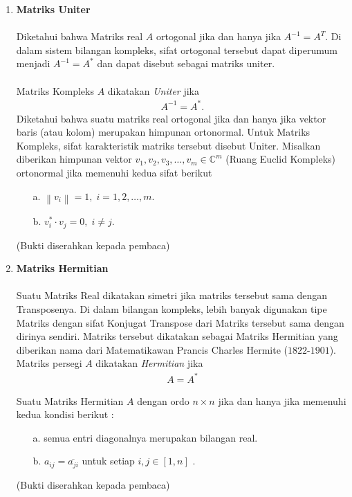 \documentclass[11pt,a4paper]{article}
\theoremstyle{plain}
\theoremstyle{definition}
\theoremstyle{remark}
\begin{document}
\begin{enumerate}
	\item \textbf{Matriks Uniter}\\
	\\
	\hspace*{0.5cm} Diketahui bahwa Matriks real $A$ ortogonal jika dan hanya jika $A^{-1}=A^{T}$. Di dalam sistem bilangan kompleks, sifat ortogonal tersebut dapat diperumum menjadi $A^{-1}=A^*$ dan dapat disebut sebagai matriks uniter.\\
	\\
	Matriks Kompleks $A$ dikatakan \textit{Uniter} jika
	\begin{align*}
		A^{-1}=A^*.	 	
	\end{align*}
	\hspace*{0.5cm} Diketahui bahwa suatu matriks real ortogonal jika dan hanya jika vektor baris (atau kolom) merupakan himpunan ortonormal. Untuk Matriks Kompleks, sifat karakteristik matriks tersebut disebut Uniter. Misalkan diberikan himpunan vektor ${v_{1},v_{2},v_{3},\ldots,v_{m}}\in \mathbb{C}^{m}$ (Ruang Euclid Kompleks) ortonormal jika memenuhi kedua sifat berikut
	\begin{enumerate}
		\item[a.] $\left\|v_{i}\right\|=1,\; i=1,2,\ldots,m$.
		\item[b.] $v_{i}^*\cdot v_{j}=0,\; i\ne j$.
	\end{enumerate}
	(Bukti diserahkan kepada pembaca)
	
	
	
	\item \textbf{Matriks Hermitian}\\
	\\
	\hspace*{0.5cm} Suatu Matriks Real dikatakan simetri jika matriks tersebut sama dengan Transposenya. Di dalam bilangan kompleks, lebih banyak digunakan tipe Matriks dengan sifat Konjugat Transpose dari Matriks tersebut sama dengan dirinya sendiri. Matriks tersebut dikatakan sebagai Matriks Hermitian yang diberikan nama dari Matematikawan Prancis Charles Hermite ($1822$-$1901$).
	\\
	Matriks persegi $A$ dikatakan \textit{Hermitian} jika
	\begin{align*}
	A=A^*
	\end{align*}
	
	Suatu Matriks Hermitian $A$ dengan ordo $n\times n$ jika dan hanya jika memenuhi kedua  kondisi berikut :
	\begin{enumerate}
		\item[a.] semua entri diagonalnya merupakan bilangan real.
		\item[b.] $a_{ij}=\overline{a_{ji}}$ untuk setiap $i,j\in\left[1,n\right]$ .
	\end{enumerate}
	(Bukti diserahkan kepada pembaca)
	

\end{enumerate}
\end{document}
